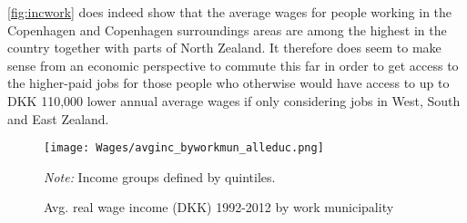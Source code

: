 \autoref{fig:incwork} does indeed show that the average wages for people working in the Copenhagen and Copenhagen surroundings areas are among the highest in the country together with parts of North Zealand. It therefore does seem to make sense from an economic perspective to commute this far in order to get access to the higher-paid jobs for those people who otherwise would have access to up to DKK 110,000 lower annual average wages if only considering jobs in West, South and East Zealand.
\begin{figure}[!htb]
\centering
\begin{minipage}{0.8\textwidth}
\texttt{[image: Wages/avginc\_byworkmun\_alleduc.png]} 
{\tiny \emph{Note:} Income groups defined by quintiles.\par}
\end{minipage}
\caption{Avg. real wage income (DKK) 1992-2012 by work municipality}
\label{fig:incwork}
\end{figure}


